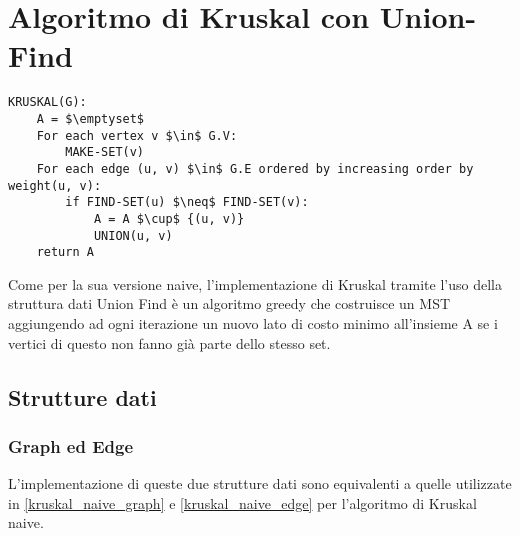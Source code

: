 \section{Algoritmo di Kruskal con Union-Find}

\begin{lstlisting}[mathescape=true]
KRUSKAL(G):
	A = $\emptyset$
	For each vertex v $\in$ G.V:
		MAKE-SET(v)
	For each edge (u, v) $\in$ G.E ordered by increasing order by weight(u, v):
		if FIND-SET(u) $\neq$ FIND-SET(v):       
			A = A $\cup$ {(u, v)}
			UNION(u, v)
	return A
\end{lstlisting}

Come per la sua versione naive, l'implementazione di Kruskal tramite l'uso della struttura dati Union Find è un algoritmo greedy che costruisce un MST aggiungendo ad ogni iterazione un nuovo lato di costo minimo all'insieme A se i vertici di questo non fanno già parte dello stesso set.

\subsection{Strutture dati}

	\subsubsection{Graph ed Edge}
		L'implementazione di queste due strutture dati sono equivalenti a quelle utilizzate in \ref{kruskal_naive_graph} e \ref{kruskal_naive_edge} per l'algoritmo di Kruskal naive.
	
